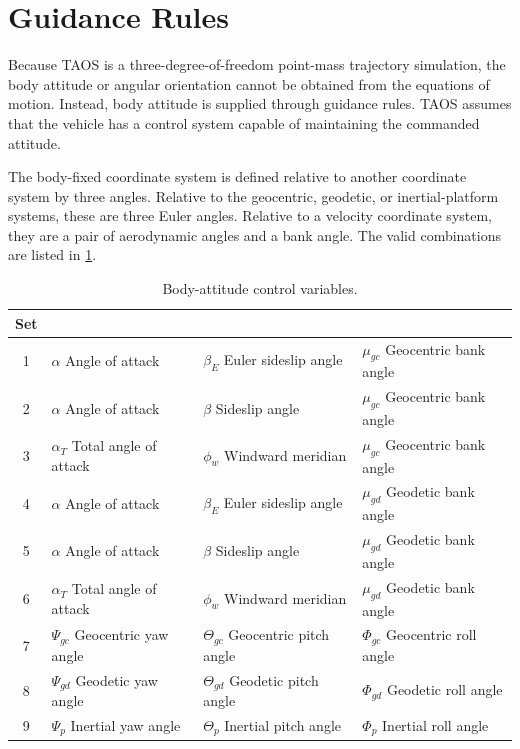 \section{Guidance Rules}\label{sec:guidance-rules}

Because TAOS is a three-degree-of-freedom point-mass trajectory simulation, the
body attitude or angular orientation cannot be obtained from the equations of
motion. Instead, body attitude is supplied through guidance rules. TAOS assumes
that the vehicle has a control system capable of maintaining the commanded
attitude.

The body-fixed coordinate system is defined relative to another coordinate system
by three angles. Relative to the geocentric, geodetic, or inertial-platform systems,
these are three Euler angles. Relative to a velocity coordinate system, they are a
pair of aerodynamic angles and a bank angle. The valid combinations are listed in
\cref{tab:body-attitude-control-variables}.

\setcounter{table}{1}

\begin{table}[htbp]
  \centering
  \caption{Body-attitude control variables.}
  \label{tab:body-attitude-control-variables}
  \small
  \renewcommand{\arraystretch}{1.12}
  \begin{tabularx}{\linewidth}{@{}c>{\raggedright\arraybackslash}X>{\raggedright\arraybackslash}X>{\raggedright\arraybackslash}X@{}}
    \toprule
    Set & \multicolumn{3}{c}{Body-attitude angles}\\
    \midrule
    1 & $\alpha$ Angle of attack & $\beta_E$ Euler sideslip angle & $\mu_{gc}$ Geocentric bank angle\\
    2 & $\alpha$ Angle of attack & $\beta$ Sideslip angle & $\mu_{gc}$ Geocentric bank angle\\
    3 & $\alpha_T$ Total angle of attack & $\phi_w$ Windward meridian & $\mu_{gc}$ Geocentric bank angle\\
    4 & $\alpha$ Angle of attack & $\beta_E$ Euler sideslip angle & $\mu_{gd}$ Geodetic bank angle\\
    5 & $\alpha$ Angle of attack & $\beta$ Sideslip angle & $\mu_{gd}$ Geodetic bank angle\\
    6 & $\alpha_T$ Total angle of attack & $\phi_w$ Windward meridian & $\mu_{gd}$ Geodetic bank angle\\
    7 & $\Psi_{gc}$ Geocentric yaw angle & $\Theta_{gc}$ Geocentric pitch angle & $\Phi_{gc}$ Geocentric roll angle\\
    8 & $\Psi_{gd}$ Geodetic yaw angle & $\Theta_{gd}$ Geodetic pitch angle & $\Phi_{gd}$ Geodetic roll angle\\
    9 & $\Psi_p$ Inertial yaw angle & $\Theta_p$ Inertial pitch angle & $\Phi_p$ Inertial roll angle\\
    \bottomrule
  \end{tabularx}
\end{table}

